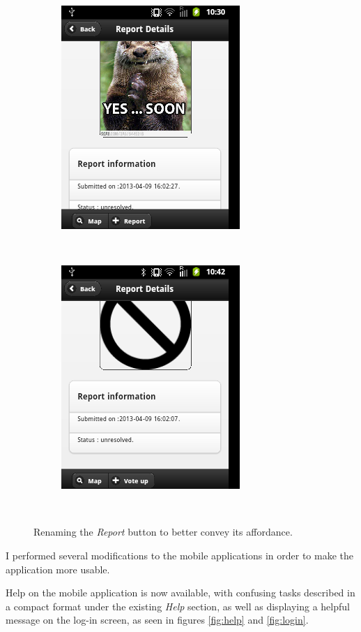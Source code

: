 \documentclass[12pt]{ecsproject}     %
\begin{document}
\begin{figure}
\centering
	\begin{subfigure}
	\centering	
	\includegraphics[scale=0.7]{report-old.png}
	\end{subfigure}
	~
	\begin{subfigure}
	\centering	
	\includegraphics[scale=0.7]{report-new.png}
	\end{subfigure}
	~
	\caption{Renaming the \textit{Report} button to better convey its affordance.}	
\label{fig:repbtn}
\end{figure}

I performed several modifications to the mobile applications in order to make the application more usable. 

Help on the mobile application is now available, with confusing tasks described in a compact format under the existing \textit{Help} section, as well as displaying a helpful message on the log-in screen, as seen in figures \ref{fig:help} and \ref{fig:login}.
\end{document}
